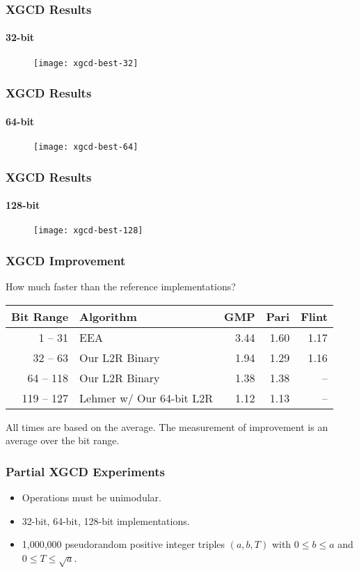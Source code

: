 \documentclass{beamer}
\newcommand{\smallfont}{\fontsize{6pt}{7.2}\selectfont}
\begin{document}
\begin{frame}
\frametitle{XGCD Results}
\framesubtitle{32-bit}
\begin{figure}
\texttt{[image: xgcd-best-32]}
\end{figure}
\end{frame}
\begin{frame}
\frametitle{XGCD Results}
\framesubtitle{64-bit}
\begin{figure}
\texttt{[image: xgcd-best-64]}
\end{figure}
\end{frame}
\begin{frame}
\frametitle{XGCD Results}
\framesubtitle{128-bit}
\begin{figure}
\texttt{[image: xgcd-best-128]}
\end{figure}
\end{frame}

\begin{frame}
\frametitle{XGCD Improvement}

How much faster than the reference implementations?
\begin{table}
\centering
\begin{tabular}{ | r | l | r | r | r | }
\hline
Bit Range & Algorithm & GMP & Pari & Flint \\
\hline
1 -- 31 & EEA & 3.44 & 1.60 & 1.17 \\
32 -- 63 & Our L2R Binary & 1.94 & 1.29 & 1.16 \\
64 -- 118 & Our L2R Binary & 1.38 & 1.38 & -- \\
119 -- 127 & Lehmer w/ Our 64-bit L2R & 1.12 & 1.13 & -- \\
\hline
\end{tabular}
\end{table}

\bigskip
\smallfont
All times are based on the average.  The measurement of improvement is an average over the bit range.
\end{frame}


\begin{frame}
\frametitle{Partial XGCD Experiments}
\begin{itemize}
\item Operations must be unimodular.
\item 32-bit, 64-bit, 128-bit implementations.
\item 1,000,000 pseudorandom positive integer triples $(a, b, T)$ with $0 \le b \le a$ and $0 \le T \le \sqrt a$.
\end{itemize}

\end{frame}
\end{document}
